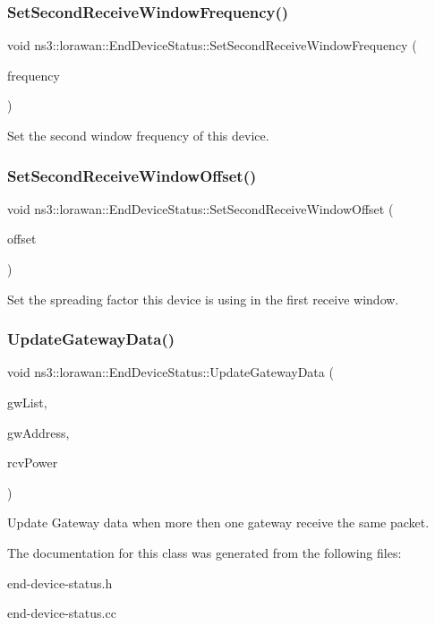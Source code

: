 \subsubsection{\texorpdfstring{Set\+Second\+Receive\+Window\+Frequency()}{SetSecondReceiveWindowFrequency()}}
{\footnotesize\ttfamily void ns3\+::lorawan\+::\+End\+Device\+Status\+::\+Set\+Second\+Receive\+Window\+Frequency (\begin{DoxyParamCaption}\item[{double}]{frequency }\end{DoxyParamCaption})}

Set the second window frequency of this device. \mbox{\label{classns3_1_1lorawan_1_1EndDeviceStatus_ac901c8879c93c79c7cc6fae82cb14909}} 
\subsubsection{\texorpdfstring{Set\+Second\+Receive\+Window\+Offset()}{SetSecondReceiveWindowOffset()}}
{\footnotesize\ttfamily void ns3\+::lorawan\+::\+End\+Device\+Status\+::\+Set\+Second\+Receive\+Window\+Offset (\begin{DoxyParamCaption}\item[{uint8\+\_\+t}]{offset }\end{DoxyParamCaption})}

Set the spreading factor this device is using in the first receive window. \mbox{\label{classns3_1_1lorawan_1_1EndDeviceStatus_a1cd60fc88eb88c1990f28e8aee71e05f}} 
\subsubsection{\texorpdfstring{Update\+Gateway\+Data()}{UpdateGatewayData()}}
{\footnotesize\ttfamily void ns3\+::lorawan\+::\+End\+Device\+Status\+::\+Update\+Gateway\+Data (\begin{DoxyParamCaption}\item[{Gateway\+List}]{gw\+List,  }\item[{Address}]{gw\+Address,  }\item[{double}]{rcv\+Power }\end{DoxyParamCaption})}

Update Gateway data when more then one gateway receive the same packet. 

The documentation for this class was generated from the following files\+:\begin{DoxyCompactItemize}
\item 
end-\/device-\/status.\+h\item 
end-\/device-\/status.\+cc\end{DoxyCompactItemize}
